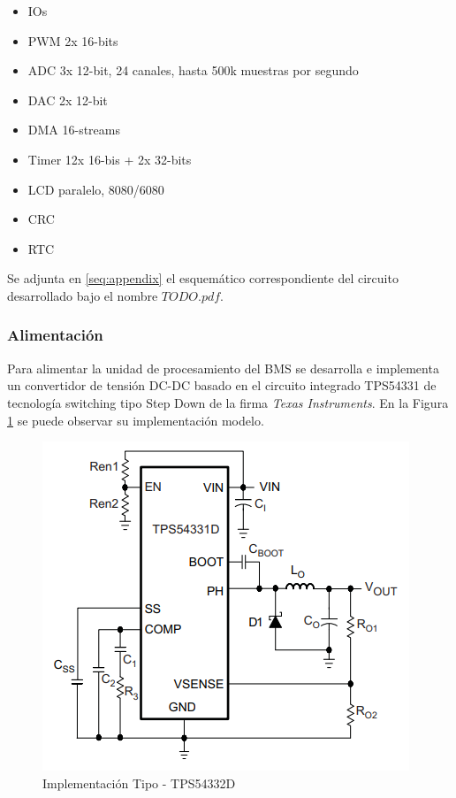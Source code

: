 \documentclass[10pt, a4paper]{article}
\begin{document}
\begin{itemize}
    \item IOs
    \item PWM 2x 16-bits
    \item ADC 3x 12-bit, 24 canales, hasta 500k muestras por segundo              
    \item DAC 2x 12-bit 
    \item DMA 16-streams
    \item Timer 12x 16-bis + 2x 32-bits 
    \item LCD paralelo, 8080/6080 
    \item CRC
    \item RTC
\end{itemize}                                                                    
                                                                                 
Se adjunta en \autoref{seq:appendix} el esquemático correspondiente del circuito 
desarrollado bajo el nombre $TODO.pdf$.                   
                                                                                 
\subsubsection{Alimentación}

Para alimentar la unidad de procesamiento del \acrshort{BMS} se desarrolla e
implementa un convertidor de tensión DC-DC basado en el circuito integrado
TPS54331 de tecnología switching tipo Step Down de la firma \emph{Texas
Instruments}. En la Figura \ref{fig:TPS54332D_common_implementation} se puede
observar su implementación modelo. 

\begin{figure}[h!]
    \begin{center}
	\includegraphics[width=0.4\linewidth]{assets/TPS54332D_common_implementation.png}
	\caption{Implementación Tipo - TPS54332D}
	\label{fig:TPS54332D_common_implementation}
    \end{center}	
\end{figure}
\end{document}
